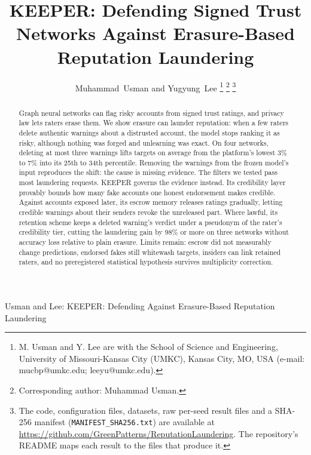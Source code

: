 \documentclass[lettersize,journal]{IEEEtran}
\begin{document}
\title{KEEPER: Defending Signed Trust Networks Against Erasure-Based Reputation Laundering}

\author{Muhammad~Usman and Yugyung~Lee%
\thanks{M. Usman and Y. Lee are with the School of Science and Engineering, University of Missouri-Kansas City (UMKC), Kansas City, MO, USA (e-mail: mucbp@umkc.edu; leeyu@umkc.edu).}%
\thanks{Corresponding author: Muhammad Usman.}%
\thanks{The code, configuration files, datasets, raw per-seed result files and a SHA-256 manifest (\texttt{MANIFEST\_SHA256.txt}) are available at \url{https://github.com/GreenPatterns/ReputationLaundering}. The repository's README maps each result to the files that produce it.}}

%
{Usman and Lee: KEEPER: Defending Against Erasure-Based Reputation Laundering}

\maketitle

\begin{abstract}
Graph neural networks can flag risky accounts from signed trust ratings, and privacy law lets raters erase them.
We show erasure can launder reputation: when a few raters delete authentic warnings about a distrusted account, the model stops ranking it as risky, although nothing was forged and unlearning was exact.
On four networks, deleting at most three warnings lifts targets on average from the platform's lowest 3\% to 7\% into its 25th to 34th percentile.
Removing the warnings from the frozen model's input reproduces the shift: the cause is missing evidence. The filters we tested pass most laundering requests.
KEEPER governs the evidence instead.
Its credibility layer provably bounds how many fake accounts one honest endorsement makes credible.
Against accounts exposed later, its escrow memory releases ratings gradually, letting credible warnings about their senders revoke the unreleased part.
Where lawful, its retention scheme keeps a deleted warning's verdict under a pseudonym of the rater's credibility tier, cutting the laundering gain by 98\% or more on three networks without accuracy loss relative to plain erasure.
Limits remain: escrow did not measurably change predictions, endorsed fakes still whitewash targets, insiders can link retained raters, and no preregistered statistical hypothesis survives multiplicity correction.
\end{abstract}
\end{document}
